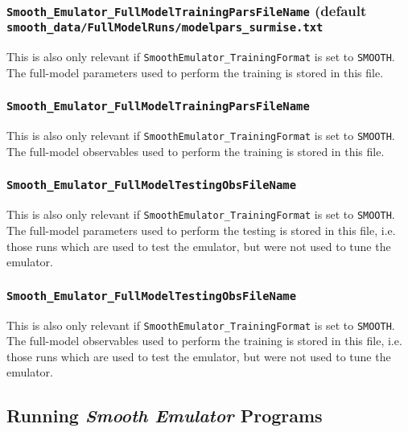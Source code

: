 \documentclass[UserManual.tex]{subfiles}
\begin{document}
\subsubsection{{\tt Smooth\_Emulator\_FullModelTrainingParsFileName} (default {\tt smooth\_data/FullModelRuns/modelpars\_surmise.txt}}
This is also only relevant if {\tt SmoothEmulator\_TrainingFormat} is set to {\tt SMOOTH}. The full-model parameters used to perform the training is stored in this file.

\subsubsection{{\tt Smooth\_Emulator\_FullModelTrainingParsFileName}}
This is also only relevant if {\tt SmoothEmulator\_TrainingFormat} is set to {\tt SMOOTH}. The full-model observables used to perform the training is stored in this file.

\subsubsection{{\tt Smooth\_Emulator\_FullModelTestingObsFileName}}
This is also only relevant if {\tt SmoothEmulator\_TrainingFormat} is set to {\tt SMOOTH}. The full-model parameters used to perform the testing is stored in this file, i.e. those runs which are used to test the emulator, but were not used to tune the emulator.

\subsubsection{{\tt Smooth\_Emulator\_FullModelTestingObsFileName}}
This is also only relevant if {\tt SmoothEmulator\_TrainingFormat} is set to {\tt SMOOTH}. The full-model observables used to perform the training is stored in this file, i.e. those runs which are used to test the emulator, but were not used to tune the emulator.

\subsection{Running {\it Smooth Emulator} Programs}
\end{document}
